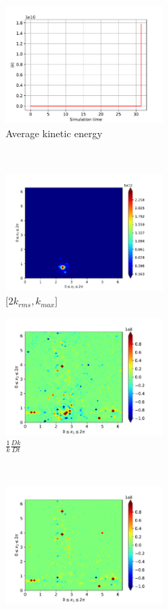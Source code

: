 \begin{figure}[H]
    \begin{subfigure}[H]{0.45\textwidth}
        \includegraphics[height=1.75in]{media/run-cds-65-5k/ke-average4750.png}
        \caption{Average kinetic energy}
    \end{subfigure}
    ~
    \begin{subfigure}[H]{0.45\textwidth}
        \includegraphics[height=1.75in]{media/run-cds-65-5k/ke-2-4750.png}
        \caption{$[2k_{rms}, k_{max} $] }
    \end{subfigure}
    \newline
    \begin{subfigure}[H]{0.45\textwidth}
        \includegraphics[height=1.75in]{media/run-cds-65-5k/ke-4750.png}
        \caption{$\frac{1}{k} \frac{D k}{Dt}$}
    \end{subfigure}
    ~
    \begin{subfigure}{0.45\textwidth}
        \includegraphics[height=1.75in]{media/run-cds-65-5k/A-ke-4750.png}

\end{subfigure}
\end{figure}
